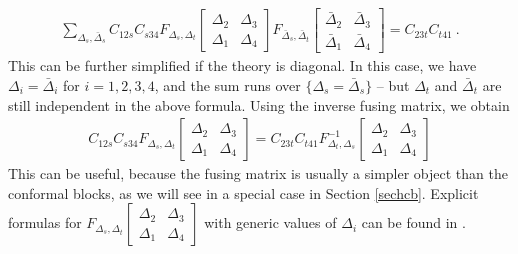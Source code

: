 \documentclass[12pt,a4paper,notitlepage]{report}
\numberwithin{equation}{section}
\theoremstyle{break}
\begin{document}
\begin{align}
 \sum_{\Delta_s,\bar{\Delta}_s} C_{12s} C_{s34}
F_{\Delta_s,\Delta_t}\begin{bmatrix} \Delta_2 & \Delta_3 \\ \Delta_1 & \Delta_4 \end{bmatrix}
F_{\bar{\Delta}_s,\bar{\Delta}_t}\begin{bmatrix} \bar{\Delta}_2 & \bar{\Delta}_3 \\ \bar{\Delta}_1 & \bar{\Delta}_4 \end{bmatrix}
=  C_{23t}C_{t41}\ .
\end{align}
This can be further simplified if the theory is diagonal.
In this case, we have $\Delta_i=\bar{\Delta}_i$ for $i=1,2,3,4$, and the sum runs over $\{\Delta_s=\bar{\Delta}_s\}$ -- but $\Delta_t$ and $\bar{\Delta}_t$ are still independent in the above formula.
Using the inverse fusing matrix, we obtain 
\begin{align}
 C_{12s} C_{s34}
F_{\Delta_s,\Delta_t}\begin{bmatrix} \Delta_2 & \Delta_3 \\ \Delta_1 & \Delta_4 \end{bmatrix}
= C_{23t}C_{t41} 
F^{-1}_{\Delta_t,\Delta_s}\begin{bmatrix} \Delta_2 & \Delta_3 \\ \Delta_1 & \Delta_4 \end{bmatrix}
\end{align}
This can be useful, because the fusing matrix is usually a simpler object than the conformal blocks, as we will see in a special case in Section \ref{sechcb}.
Explicit formulas for $F_{\Delta_s,\Delta_t}\begin{bmatrix} \Delta_2 & \Delta_3 \\ \Delta_1 & \Delta_4 \end{bmatrix}$ with generic values of $\Delta_i$ can be found in \cite{tv12}.
\end{document}
